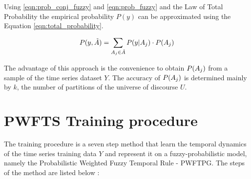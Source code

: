 Using \eqref{eqn:prob_conj_fuzzy} and \eqref{eqn:prob_fuzzy} and the Law of Total Probability the empirical probability $P(y)$ can be approximated using the Equation \eqref{eqn:total_probability}. 

\begin{equation}
P(y,\tilde{A}) = \sum_{A_j \in \tilde{A}} P(y | A_j)\cdot P(A_j)
\label{eqn:total_probability}
\end{equation}

The advantage of this approach is the convenience to obtain $P(A_j)$ from a sample of the time series dataset $Y$. The accuracy of $P(A_j)$ is determined mainly by $k$, the number of partitions of the universe of discourse $U$.


\section{PWFTS Training procedure}
\label{sec:pwfts_training}

The training procedure is a seven step method that learn the temporal dynamics of the time series training data $Y$ and represent it on a fuzzy-probabilistic model, namely the Probabilistic Weighted Fuzzy Temporal Rule - PWFTPG. The steps of the method are listed below :

